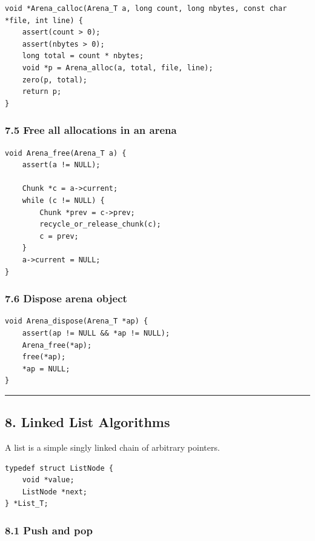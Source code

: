 \documentclass[11pt]{article}
\begin{document}
\begin{verbatim}
void *Arena_calloc(Arena_T a, long count, long nbytes, const char *file, int line) {
    assert(count > 0);
    assert(nbytes > 0);
    long total = count * nbytes;
    void *p = Arena_alloc(a, total, file, line);
    zero(p, total);
    return p;
}
\end{verbatim}

\subsubsection{7.5 Free all allocations in an arena}\label{free-all-allocations-in-an-arena}

\begin{verbatim}
void Arena_free(Arena_T a) {
    assert(a != NULL);

    Chunk *c = a->current;
    while (c != NULL) {
        Chunk *prev = c->prev;
        recycle_or_release_chunk(c);
        c = prev;
    }
    a->current = NULL;
}
\end{verbatim}

\subsubsection{7.6 Dispose arena object}\label{dispose-arena-object}

\begin{verbatim}
void Arena_dispose(Arena_T *ap) {
    assert(ap != NULL && *ap != NULL);
    Arena_free(*ap);
    free(*ap);
    *ap = NULL;
}
\end{verbatim}

\begin{center}\rule{0.5\linewidth}{0.5pt}\end{center}

\subsection{8. Linked List Algorithms}\label{linked-list-algorithms}

A list is a simple singly linked chain of arbitrary pointers.

\begin{verbatim}
typedef struct ListNode {
    void *value;
    ListNode *next;
} *List_T;
\end{verbatim}

\subsubsection{8.1 Push and pop}\label{push-and-pop}
\end{document}
